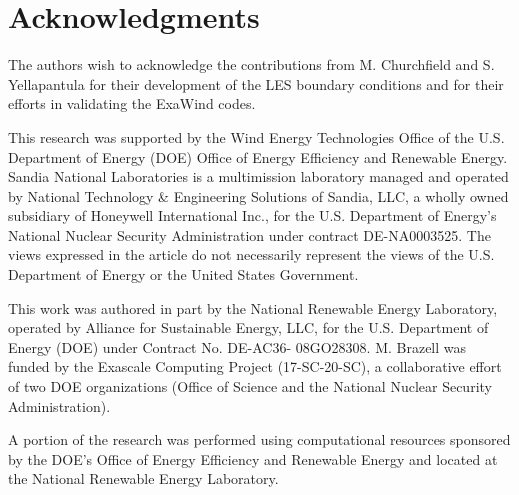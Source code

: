 \documentclass[conf]{new-aiaa}
\begin{document}



\section*{Acknowledgments}

The authors wish to acknowledge the contributions from M. Churchfield
and S. Yellapantula for their development of the LES boundary
conditions and for their efforts in validating the ExaWind codes.

This research was supported by the Wind Energy Technologies Office of the
U.S. Department of Energy (DOE) Office of Energy Efficiency and Renewable
Energy.  Sandia National Laboratories is a multimission laboratory managed and
operated by National Technology \& Engineering Solutions of Sandia, LLC, a
wholly owned subsidiary of Honeywell International Inc., for the U.S. Department
of Energy's National Nuclear Security Administration under contract
DE-NA0003525. The views expressed in the article do not necessarily represent
the views of the U.S. Department of Energy or the United States Government.

This work was authored in part by the National Renewable Energy Laboratory,
operated by Alliance for Sustainable Energy, LLC, for the U.S. Department of
Energy (DOE) under Contract No. DE-AC36- 08GO28308. M. Brazell was funded by the
Exascale Computing Project (17-SC-20-SC), a collaborative effort of two DOE
organizations (Office of Science and the National Nuclear Security
Administration).

A portion of the research was performed using computational resources sponsored
by the DOE's Office of Energy Efficiency and Renewable Energy and located at the
National Renewable Energy Laboratory.


\end{document}
